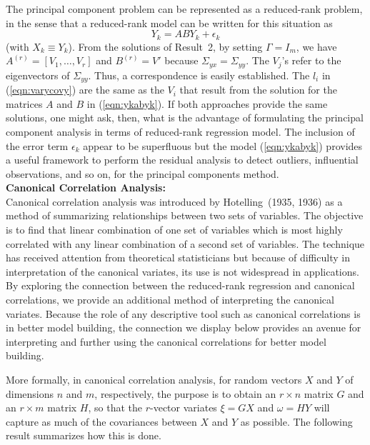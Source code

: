 The principal component problem can be represented as a reduced-rank problem, in the sense that a reduced-rank model can be written for this situation as
	\begin{equation}\label{eqn:ykabyk}
	Y_k= ABY_k + \epsilon_k
	\end{equation}
(with $X_k \equiv Y_k$). From the solutions of Result~2, by setting $\Gamma=I_m$, we have $A^{(r)}=[V_1,\ldots,V_r]$ and $B^{(r)}=V'$ because $\Sigma_{yx}=\Sigma_{yy}$. The $V_j$'s refer to the eigenvectors of $\Sigma_{yy}$. Thus, a correspondence is easily established. The $l_i$ in (\ref{eqn:varycovy}) are the same as the $V_i$ that result from the solution for the matrices $A$ and $B$ in (\ref{eqn:ykabyk}). If both approaches provide the same solutions, one might ask, then, what is the advantage of formulating the principal component analysis in terms of reduced-rank regression model. The inclusion of the error term $\epsilon_k$ appear to be superfluous but the model (\ref{eqn:ykabyk}) provides a useful framework to perform the residual analysis to detect outliers, influential observations, and so on, for the principal components method. \\


\noindent \textbf{Canonical Correlation Analysis:} \\


\noindent Canonical correlation analysis was introduced by Hotelling~(1935, 1936) as a method of summarizing relationships between two sets of variables. The objective is to find that linear combination of one set of variables which is most highly correlated with any linear combination of a second set of variables. The technique has received attention from theoretical statisticians but because of difficulty in interpretation of the canonical variates, its use is not widespread in applications. By exploring the connection between the reduced-rank regression and canonical correlations, we provide an additional method of interpreting the canonical variates. Because the role of any descriptive tool such as canonical correlations is in better model building, the connection we display below provides an avenue for interpreting and further using the canonical correlations for better model building.


More formally, in canonical correlation analysis, for random vectors $X$ and $Y$ of dimensions $n$ and $m$, respectively, the purpose is to obtain an $r \times n$ matrix $G$ and an $r \times m$ matrix $H$, so that the $r$-vector variates $\xi=GX$ and $\omega=HY$ will capture as much of the covariances between $X$ and $Y$ as possible. The following result summarizes how this is done. \\

